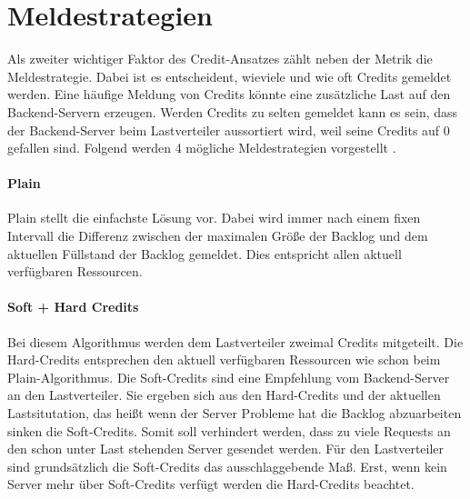 \documentclass[a4paper, 12pt, BCOR10mm, DIV12, toc=bibliography, toc=listof, german]{scrbook}
\begin{document}

		\section{Meldestrategien} %
		\label{sub:meldestrategien}

			Als zweiter wichtiger Faktor des Credit-Ansatzes zählt neben der Metrik die Meldestrategie. Dabei
			ist es entscheident, wieviele und wie oft Credits gemeldet werden. Eine häufige Meldung von Credits
			könnte eine zusätzliche Last auf den Backend-Servern erzeugen. Werden Credits zu selten gemeldet
			kann es sein, dass der Backend-Server beim Lastverteiler aussortiert wird, weil seine Credits auf
			0 gefallen sind. Folgend werden 4 mögliche Meldestrategien vorgestellt \cite{scsczile2008,
			schneidenbach2009}.

			\paragraph{Plain} %
			\label{par:plain}

				Plain stellt die einfachste Lösung vor. Dabei wird immer nach einem fixen Intervall die
				Differenz zwischen der maximalen Größe der Backlog und dem aktuellen Füllstand der Backlog
				gemeldet. Dies entspricht allen aktuell verfügbaren Ressourcen.


			\paragraph{Soft + Hard Credits} %
			\label{par:soft-hard-credits}

			Bei diesem Algorithmus werden dem Lastverteiler zweimal Credits mitgeteilt. Die Hard-Credits
			entsprechen den aktuell verfügbaren Ressourcen wie schon beim Plain-Algorithmus. Die Soft-Credits
			sind eine Empfehlung vom Backend-Server an den Lastverteiler. Sie ergeben sich aus den
			Hard-Credits und der aktuellen Lastsitutation, das heißt wenn der Server Probleme hat die Backlog
			abzuarbeiten sinken die Soft-Credits. Somit soll verhindert werden, dass zu viele Requests an den
			schon unter Last stehenden Server gesendet werden. Für den Lastverteiler sind grundsätzlich die
			Soft-Credits das ausschlaggebende Maß. Erst, wenn kein Server mehr über Soft-Credits verfügt
			werden die Hard-Credits beachtet.

\end{document}
